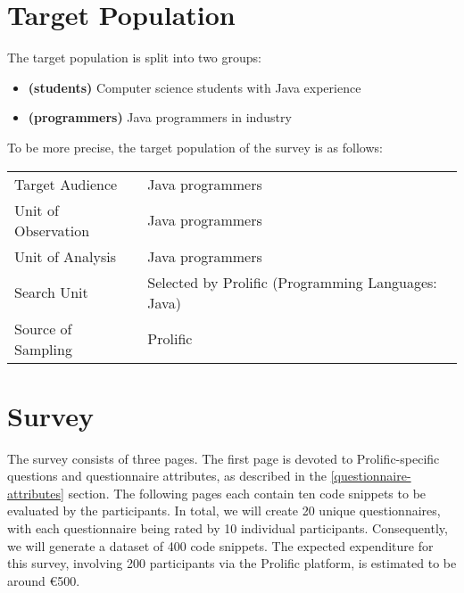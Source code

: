 \documentclass[%
class=scrreprt,
chapterprefix=false,%
open=right,%
twoside=false,%
paper=a4,%
logofile={Logo\_zentral\_farbig\_EN.png},%
thesistype=masterproposal,%
UKenglish,%
]{se2thesis}
\begin{document}
\section{Target Population} \label{target-population}
The target population is split into two groups:
\begin{itemize}
	\item \label{students} \textbf{(students)}
	Computer science students with Java experience
	\item \label{programmers} \textbf{(programmers)} Java programmers in industry
\end{itemize}

To be more precise, the target population of the survey is as follows:
\begin{center}
	\begin{tabular}{|l|l|}
		\hline
		Target Audience      & Java programmers \\
		Unit of Observation  & Java programmers \\
		Unit of Analysis     & Java programmers \\
		Search Unit %
		& Selected by Prolific (Programming Languages: Java)\\
		Source of Sampling   & %
		Prolific \\
		\hline
	\end{tabular}
\end{center}


\section{Survey}
The survey consists of three pages. The first page is devoted to Prolific-specific questions and questionnaire attributes, as described in the \ref{questionnaire-attributes} section. The following pages each contain ten code snippets to be evaluated by the participants.
In total, we will create 20 unique questionnaires, with each questionnaire being rated by 10 individual participants. Consequently, we will generate a dataset of 400 code snippets. The expected expenditure for this survey, involving 200 participants via the Prolific platform, is estimated to be around €500.
\end{document}
